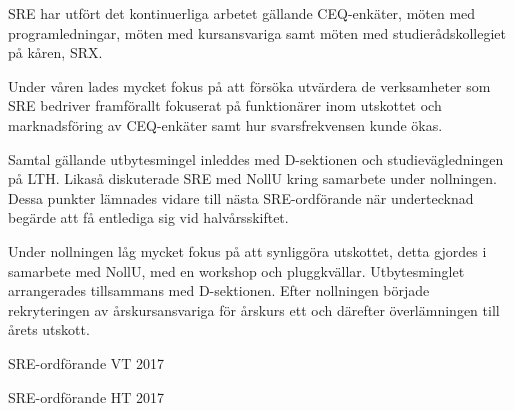 \documentclass[../_main/handlingar.tex]{subfiles}
\begin{document}
SRE har utfört det kontinuerliga arbetet gällande CEQ-enkäter, möten med programledningar, möten med kursansvariga samt möten med studierådskollegiet på kåren, SRX.

Under våren lades mycket fokus på att försöka utvärdera de verksamheter som SRE bedriver framförallt fokuserat på funktionärer inom utskottet och marknadsföring av CEQ-enkäter samt hur svarsfrekvensen kunde ökas.

Samtal gällande utbytesmingel inleddes med D-sektionen och studievägledningen på LTH. Likaså diskuterade SRE med NollU kring samarbete under nollningen. Dessa punkter lämnades vidare till nästa SRE-ordförande när undertecknad begärde att få entlediga sig vid halvårsskiftet.

Under nollningen låg mycket fokus på att synliggöra utskottet, detta gjordes i samarbete med NollU, med en workshop och pluggkvällar. Utbytesminglet arrangerades tillsammans med D-sektionen. Efter nollningen började rekryteringen av årskursansvariga för årskurs ett och därefter överlämningen till årets utskott.

\begin{signatures}{2}
    \mvh
    \signature{Pontus Landgren}{SRE-ordförande VT 2017}
    \signature{Edvard Carlsson}{SRE-ordförande HT 2017}
\end{signatures}
\end{document}
